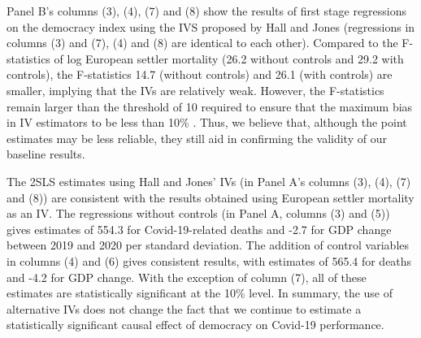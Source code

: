 Panel B's columns (3), (4), (7) and (8) show the results of first stage regressions on the democracy index using the IVS proposed by Hall and Jones (regressions in columns (3) and (7), (4) and (8) are identical to each other). Compared to the F-statistics of log European settler mortality (26.2 without controls and 29.2 with controls), the F-statistics 14.7 (without controls) and 26.1 (with controls) are smaller, implying that the IVs are relatively weak. However, the F-statistics remain larger than the threshold  of 10 required to ensure that the maximum bias in IV estimators to be less than 10\% \parencite{staiger-stock}. Thus, we believe that, although the point estimates may be less reliable, they still aid in confirming the validity of our baseline results. 

The 2SLS estimates using Hall and Jones' IVs (in Panel A's columns (3), (4), (7) and (8)) are consistent with the results obtained using European settler mortality as an IV. The regressions without controls (in Panel A, columns (3) and (5)) gives estimates of 554.3 for Covid-19-related deaths and -2.7 for GDP change between 2019 and 2020 per standard deviation. The addition of control variables in columns (4) and (6) gives consistent results, with estimates of 565.4 for deaths and -4.2 for GDP change. With the exception of column (7), all of these estimates are statistically significant at the 10\% level. In summary, the use of alternative IVs does not change the fact that we continue to estimate a statistically significant causal effect of democracy on Covid-19 performance. 

